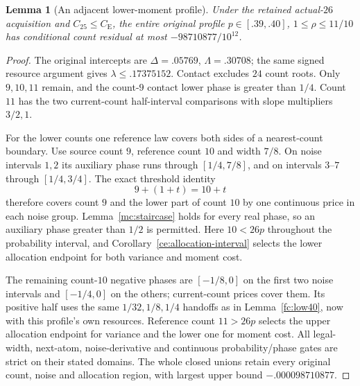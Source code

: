 \documentclass[aop,preprint]{imsart}
\newtheorem{lemma}[theorem]{Lemma}
\theoremstyle{definition}
\newcommand{\CE}{C_{\mathrm E}}
\numberwithin{equation}{section}
\begin{document}
\begin{lemma}[An adjacent lower-moment profile]\label{fc:low39}
Under the retained actual-$26$ acquisition and $C_{25}\le\CE$,
the entire original profile $p\in[.39,.40]$, $1\le\rho\le11/10$
has conditional count residual at most $-98710877/10^{12}$.
\end{lemma}
\begin{proof}
The original intercepts are $\Delta=.05769$, $\Lambda=.30708$;
the same signed resource argument gives $\lambda\le .17375152$.
Contact excludes $24$ count roots. Only $9,10,11$ remain, and
the count-$9$ contact lower phase is greater than $1/4$.
Count $11$ has the two current-count half-interval comparisons
with slope multipliers $3/2,1$.

For the lower counts one reference law covers both sides of a
nearest-count boundary. Use source count $9$, reference count $10$
and width $7/8$. On noise intervals $1,2$ its auxiliary phase runs
through $[1/4,7/8]$, and on intervals $3$--$7$ through $[1/4,3/4]$.
The exact threshold identity
\[
 9+(1+t)=10+t
\]
therefore covers count $9$ and the lower part of count $10$ by
one continuous price in each noise group. Lemma~\ref{mc:staircase}
holds for every real phase, so an auxiliary phase greater than
$1/2$ is permitted. Here $10<26p$ throughout the probability
interval, and Corollary~\ref{ce:allocation-interval} selects the
lower allocation endpoint for both variance and moment cost.

The remaining count-$10$ negative phases are $[-1/8,0]$ on
the first two noise intervals and $[-1/4,0]$ on the others;
current-count prices cover them. Its positive half uses the
same $1/32,1/8,1/4$ handoffs as in Lemma~\ref{fc:low40}, now
with this profile's own resources. Reference count $11>26p$
selects the upper allocation endpoint for variance and the lower
one for moment cost. All legal-width, next-atom, noise-derivative
and continuous probability/phase gates are strict on their stated
domains. The whole closed unions retain every original count,
noise and allocation region, with largest upper bound
$-.000098710877$.
\end{proof}
\end{document}
